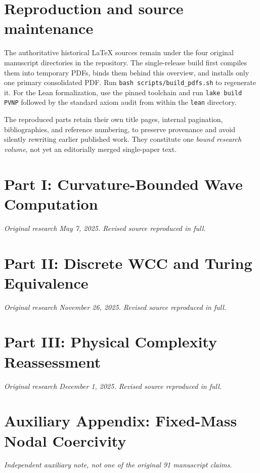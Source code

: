 \documentclass[11pt]{article}
\begin{document}
\section{Reproduction and source maintenance}
The authoritative historical LaTeX sources remain under the four original manuscript directories in the repository. The single-release build first compiles them into temporary PDFs, binds them behind this overview, and installs only one primary consolidated PDF. Run \texttt{bash scripts/build\_pdfs.sh} to regenerate it. For the Lean formalization, use the pinned toolchain and run \texttt{lake build PVNP} followed by the standard axiom audit from within the \texttt{lean} directory.

The reproduced parts retain their own title pages, internal pagination, bibliographies, and reference numbering, to preserve provenance and avoid silently rewriting earlier published work. They constitute one \emph{bound research volume}, not yet an editorially merged single-paper text.

\clearpage
{}
\section*{Part I: Curvature-Bounded Wave Computation}
\emph{Original research May 7, 2025. Revised source reproduced in full.}
\clearpage


\clearpage
{}
\section*{Part II: Discrete WCC and Turing Equivalence}
\emph{Original research November 26, 2025. Revised source reproduced in full.}
\clearpage


\clearpage
{}
\section*{Part III: Physical Complexity Reassessment}
\emph{Original research December 1, 2025. Revised source reproduced in full.}
\clearpage


\clearpage
{}
\section*{Auxiliary Appendix: Fixed-Mass Nodal Coercivity}
\emph{Independent auxiliary note, not one of the original 91 manuscript claims.}
\clearpage

\end{document}
